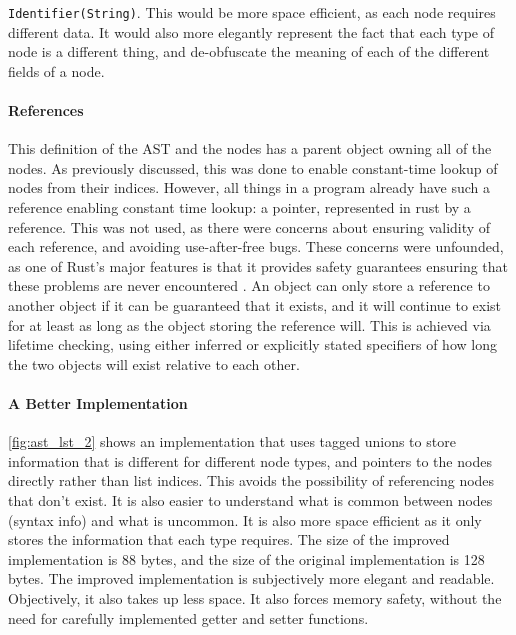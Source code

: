 \noindent\verb|Identifier(String)|. This would be more space efficient, as each node requires different data. It would also more elegantly represent the fact that each type of node is a different thing, and de-obfuscate the meaning of each of the different fields of a node. 

\paragraph{References}
This definition of the \ac{AST}  and the nodes has a parent object owning all of the nodes. As previously discussed, this was done to enable constant-time lookup of nodes from their indices. However, all things in a program already have such a reference enabling constant time lookup: a pointer, represented in rust by a reference. This was not used, as there were concerns about ensuring validity of each reference, and avoiding use-after-free bugs. These concerns were unfounded, as one of Rust's major features is that it provides safety guarantees ensuring that these problems are never encountered \cite{rust_book}. An object can only store a reference to another object if it can be guaranteed that it exists, and it will continue to exist for at least as long as the object storing the reference will. This is achieved via lifetime checking, using either inferred or explicitly stated specifiers of how long the two objects will exist relative to each other. 

\paragraph{A Better Implementation}
\ref{fig:ast_lst_2} shows an implementation that uses tagged unions to store information that is different for different node types, and pointers to the nodes directly rather than list indices. This avoids the possibility of referencing nodes that don't exist. It is also easier to understand what is common between nodes (syntax info) and what is uncommon. It is also more space efficient as it only stores the information that each type requires. The size of the improved implementation is 88 bytes, and the size of the original implementation is 128 bytes. The improved implementation is subjectively more elegant and readable. Objectively, it also takes up less space. It also forces memory safety, without the need for carefully implemented getter and setter functions. 

